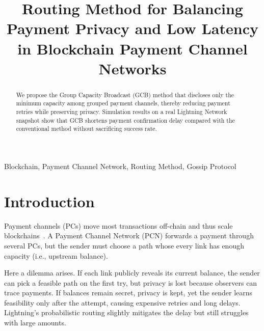\documentclass[conference]{IEEEtran}
\begin{document}
\title{Routing Method for Balancing Payment Privacy and Low Latency in Blockchain Payment Channel Networks}

\author{
	\and
}

\maketitle

\begin{abstract}
	We propose the Group Capacity Broadcast (GCB) method that discloses only the minimum capacity among grouped payment channels, thereby reducing payment retries while preserving privacy. Simulation results on a real Lightning Network snapshot show that GCB shortens payment confirmation delay compared with the conventional method without sacrificing success rate.
\end{abstract}

\begin{IEEEkeywords}
	Blockchain, Payment Channel Network, Routing Method, Gossip Protocol
\end{IEEEkeywords}

\section{Introduction}

Payment channels (PCs) move most transactions off-chain and thus scale blockchains~\cite{poon_dryja_2016}. A Payment Channel Network (PCN) forwards a payment through several PCs, but the sender must choose a path whose every link has enough capacity (i.e., upstream balance).

Here a dilemma arises.  If each link publicly reveals its current balance, the sender can pick a feasible path on the first try, but privacy is lost because observers can trace payments.  If balances remain secret, privacy is kept, yet the sender learns feasibility only after the attempt, causing expensive retries and long delays.  Lightning's probabilistic routing slightly mitigates the delay but still struggles with large amounts.
\end{document}
